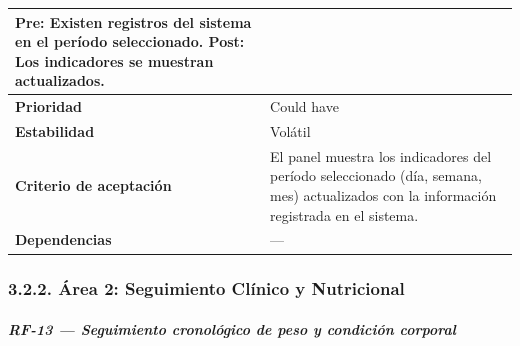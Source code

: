 \documentclass[
]{article}
\begin{document}
{\begin{longtable}[]{|
  >{\raggedright\arraybackslash}p{}|
  >{\raggedright\arraybackslash}p{}|}
\begin{minipage}[t]{\linewidth}
Pre: Existen registros del sistema en el período seleccionado. Post: Los indicadores se muestran actualizados.
\end{minipage} \\
\hline
\textbf{Prioridad} & \begin{minipage}[t]{\linewidth}\raggedright
Could have
\end{minipage} \\
\hline
\textbf{Estabilidad} & \begin{minipage}[t]{\linewidth}\raggedright
Volátil
\end{minipage} \\
\hline
\textbf{Criterio de aceptación} &
\begin{minipage}[t]{\linewidth}\raggedright
El panel muestra los indicadores del período seleccionado (día, semana, mes) actualizados con la información registrada en el sistema.
\end{minipage} \\
\hline
\textbf{Dependencias} & \begin{minipage}[t]{\linewidth}\raggedright
—
\end{minipage} \\
\hline
\end{longtable}
}

\subsubsection{3.2.2. Área 2: Seguimiento Clínico y Nutricional}\label{area-2-seguimiento-clinico}

\subparagraph{RF-13 --- Seguimiento cronológico de peso y condición corporal}\label{rf-13-seguimiento-cronol-gico-de-peso-y-condic}
\end{document}
